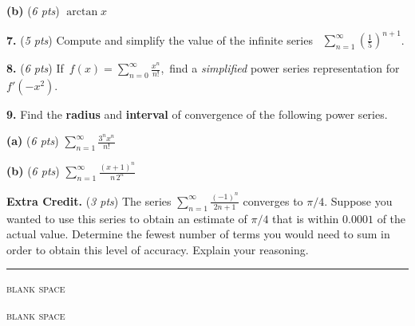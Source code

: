 \documentclass[12pt]{article}
\renewcommand{\emph}[1]{\textsf{\textbf{#1}}}
\let\ds\displaystyle
\newcommand{\prob}[1]{\bigskip\noindent\textbf{#1.} }
\newcommand{\pts}[1]{{\small (\textsl{#1 pts})}}
\newcommand{\probpts}[2]{\prob{#1} \pts{#2} \quad}
\newcommand{\epartpts}[2]{\medskip\noindent \textbf{(#1)} \pts{#2} \quad}
\begin{document}
\noindent \hfill \fbox{\bspread $\ds \frac{1}{1+x^2}=$ \hspace{4.0in}}
\bigskip

\epartpts{b}{6}  $\ds \arctan x$
\vfill

\hfill\fbox{\bspread $\ds \arctan x=$ \hspace{4.0in}}
\bigskip


\newpage\clearpage
\probpts{7}{5} Compute and simplify the value of the infinite series \, $\ds \sum_{n=1}^\infty \left(\frac{1}{5}\right)^{n+1}$.
\vspace{2.5in}

\probpts{8}{6} If \,$\ds f(x)=\sum_{n=0}^\infty \frac{x^n}{n!}$,\, find a \textsl{simplified} power series representation for $f'(-x^2)$.
\vfill
\hfill \fbox{\bspread $\ds f'(-x^2)=$ \hspace{4.0in}}


\newpage\clearpage
\prob{9} Find the \emph{radius} and \emph{interval} of convergence of the following power series.

\epartpts{a}{6} $\ds \sum_{n=1}^\infty \frac{3^n x^n}{n!}$
\vspace{2.5in}

\hfill \fbox{\spread $\ds R=$ \hspace{1.5in}} \qquad {}

\epartpts{b}{6} $\ds \sum_{n=1}^\infty \frac{(x+1)^n}{n\, 2^n}$
\vfill

\hfill \fbox{\spread $\ds R=$ \hspace{1.5in}} \qquad {}


\newpage\clearpage
\probpts{Extra Credit}{3} The series $\displaystyle \sum_{n=1}^\infty \frac{(-1)^n}{2n+1}$ converges to $\pi/4$.  Suppose you wanted to use this series to obtain an estimate of $\pi/4$ that is within $0.0001$ of the actual value.  Determine the fewest number of terms you would need to sum in order to obtain this level of accuracy.  Explain your reasoning.
\vfill

\noindent \hrule
\medskip
\centerline{\footnotesize \textsc{blank space}}
\vfill

\newpage\clearpage
\medskip
\centerline{\footnotesize \textsc{blank space}}
\vfill
\end{document}
